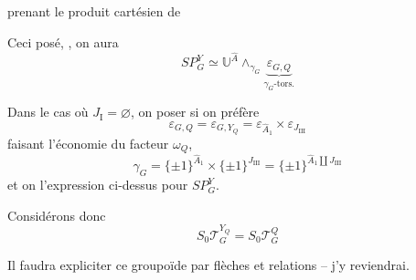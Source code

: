 prenant le produit cartésien de

Ceci posé, , on aura
\[
SP_G^Y\simeq\mathbb U^{\widehat A}\mathop{\wedge}_{\gamma_G}
\underbrace{\varepsilon_{G,Q}}_{\gamma_G\text{-tors.}}
\]

Dans le cas où $J_{\mathrm I}=\varnothing$, on  poser si on préfère
\[
\varepsilon_{G,Q}=\varepsilon_{G,Y_Q}=\varepsilon_{\widehat A_1}\times\varepsilon_{J_{\mathrm{III}}}
\]
faisant l'économie du facteur $\omega_Q$, 
\[
\gamma_G=\{\pm1\}^{\widehat A_1}\times\{\pm1\}^{J_{\mathrm{III}}}
=\{\pm1\}^{\widehat A_1\amalg J_{\mathrm{III}}}
\]
et on  l'expression ci-dessus pour $SP_G^Y$.

Considérons donc
\[
S_0\mathcal T_G^{Y_Q}=S_0\mathcal T_G^Q
\]

Il faudra expliciter ce groupoïde   par flèches  et relations -- j'y reviendrai.

